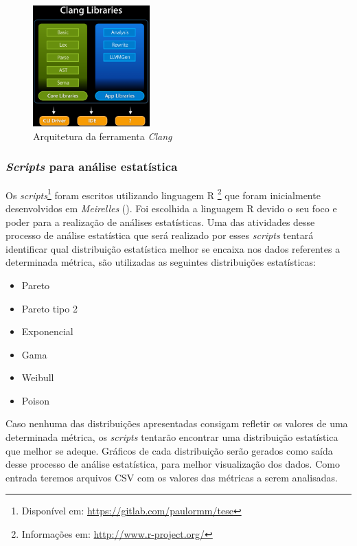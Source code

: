 \begin{figure}[h]
  \centering
  \includegraphics[width=0.4\textwidth]
      {figuras/clang_arch.eps}
      \caption{Arquitetura da ferramenta \emph{Clang}}
  \label{clang_arch}
\end{figure}

\subsubsection{\textit{Scripts} para análise estatística} \label{scripts}

Os \textit{scripts}\footnote{Disponível em:
\url{https://gitlab.com/paulormm/tese}} foram escritos utilizando linguagem R
\footnote{Informações em: \url{http://www.r-project.org/}} que foram
inicialmente desenvolvidos em \emph{Meirelles} (\citeyear{meirelles2013}). Foi escolhida a linguagem R
devido o seu foco e poder para a realização de análises estatísticas. Uma das
atividades desse processo de análise estatística que será realizado
por esses \textit{scripts} tentará identificar qual distribuição estatística melhor se encaixa nos dados referentes a 
determinada métrica, são utilizadas as seguintes distribuições estatísticas:

\begin{itemize}
  \item Pareto
  \item Pareto tipo 2
  \item Exponencial
  \item Gama
  \item Weibull
  \item Poison
\end{itemize}

Caso nenhuma das distribuições apresentadas consigam refletir os valores de uma determinada métrica, os
\textit{scripts} tentarão encontrar uma distribuição estatística que melhor se adeque. Gráficos de cada distribuição serão
gerados como saída desse processo de análise estatística, para melhor visualização dos dados. Como entrada teremos arquivos
CSV com os valores das métricas a serem analisadas.


